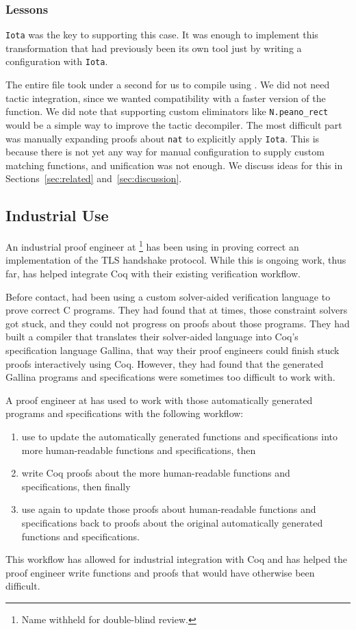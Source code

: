 \subsubsection{Lessons}

\lstinline{Iota} was the key to supporting this case.
It was enough to implement this transformation that had previously been its own tool
just by writing a configuration with \lstinline{Iota}. 

The entire file took under a second for us to compile using \toolname.
We did not need tactic integration, since we
wanted compatibility with a faster version of the function.
We did note that supporting custom eliminators like \lstinline{N.peano_rect} would be a simple way
to improve the tactic decompiler.
The most difficult part was manually expanding proofs about \lstinline{nat}
to explicitly apply \lstinline{Iota}.
This is because there is not yet any way for manual configuration to supply custom matching functions,
and unification was not enough.
We discuss ideas for this in Sections~\ref{sec:related} and~\ref{sec:discussion}.

\subsection{Industrial Use}
\label{sec:industry}

An industrial proof engineer at \company\footnote{Name withheld for double-blind review.} has been using \toolname in proving
correct an implementation of the TLS handshake protocol.
While this is ongoing work, thus far,
\toolname has helped \company integrate Coq with their existing verification workflow.

Before contact, \company had been using a custom solver-aided verification language to prove correct C programs.
They had found that at times, those constraint solvers got stuck, and they could not
progress on proofs about those programs.
They had built a compiler that translates their solver-aided language into Coq's specification language Gallina,
that way their proof engineers could finish stuck proofs interactively using Coq.
However, they had found that the generated Gallina programs and specifications were sometimes too difficult to work with.

A proof engineer at \company has used \toolname to work with those automatically generated programs and specifications
with the following workflow:

\begin{enumerate}
\item use \toolname to update the automatically generated functions and specifications into more
human-readable functions and specifications, then
\item write Coq proofs about the more human-readable functions and specifications, then finally
\item use \toolname again to update those proofs about human-readable functions and specifications back to
proofs about the original automatically generated functions and specifications.
\end{enumerate}
This workflow has allowed for industrial integration with Coq and has helped the proof engineer write functions and proofs
that would have otherwise been difficult.

